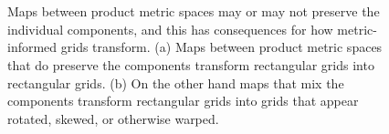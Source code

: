 \documentclass[
  letterpaper,
  DIV=11,
  numbers=noendperiod]{scrartcl}
\begin{document}
\begin{figure}
\begin{minipage}[t]{0.05\linewidth}
{\centering 

~

}

\end{minipage}%
%
\begin{minipage}[t]{0.90\linewidth}

{\centering 


}

\subcaption{\label{fig-pushforward-grids2}}
\end{minipage}%
%
\begin{minipage}[t]{0.05\linewidth}

{\centering 

~

}

\end{minipage}%

\caption{\label{fig-pushforward-grids}Maps between product metric spaces
may or may not preserve the individual components, and this has
consequences for how metric-informed grids transform. (a) Maps between
product metric spaces that do preserve the components transform
rectangular grids into rectangular grids. (b) On the other hand maps
that mix the components transform rectangular grids into grids that
appear rotated, skewed, or otherwise warped.}

\end{figure}
\end{document}
